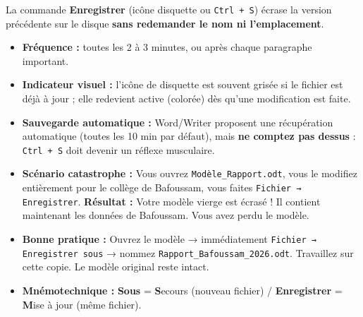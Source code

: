 \documentclass[11pt]{article}
\begin{document}
\begin{propriete}
La commande \textbf{Enregistrer} (icône disquette ou \texttt{Ctrl + S}) écrase la version précédente sur le disque \textbf{sans redemander le nom ni l'emplacement}.
\begin{itemize}
    \item \textbf{Fréquence :} toutes les 2 à 3 minutes, ou après chaque paragraphe important.
    \item \textbf{Indicateur visuel :} l'icône de disquette est souvent grisée si le fichier est déjà à jour ; elle redevient active (colorée) dès qu'une modification est faite.
    \item \textbf{Sauvegarde automatique :} Word/Writer proposent une récupération automatique (toutes les 10 min par défaut), mais \textbf{ne comptez pas dessus} : \texttt{Ctrl + S} doit devenir un réflexe musculaire.
\end{itemize}
\end{propriete}

\begin{attention}
\begin{itemize}
    \item \textbf{Scénario catastrophe :} Vous ouvrez \texttt{Modèle\_Rapport.odt}, vous le modifiez entièrement pour le collège de Bafoussam, vous faites \texttt{Fichier → Enregistrer}. \textbf{Résultat :} Votre modèle vierge est écrasé ! Il contient maintenant les données de Bafoussam. Vous avez perdu le modèle.
    \item \textbf{Bonne pratique :} Ouvrez le modèle → immédiatement \texttt{Fichier → Enregistrer sous} → nommez \texttt{Rapport\_Bafoussam\_2026.odt}. Travaillez sur cette copie. Le modèle original reste intact.
    \item \textbf{Mnémotechnique :} \og \textbf{Sous} = \textbf{S}ecours (nouveau fichier) / \og \textbf{Enregistrer} = \textbf{M}ise à jour (même fichier).
\end{itemize}
\end{attention}
\end{document}
